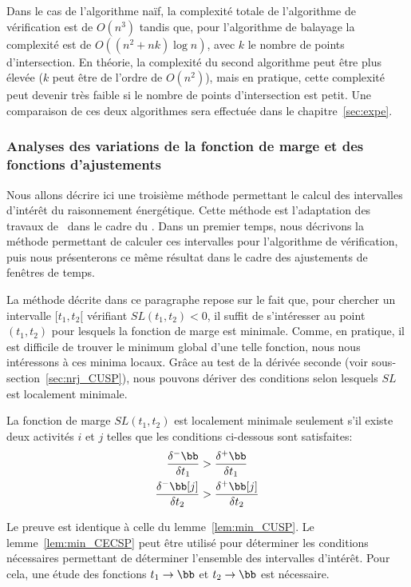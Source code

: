 Dans le cas de l'algorithme naïf, la complexité totale de l'algorithme
de vérification est de $O(n^3)$ tandis que, pour l'algorithme de
balayage la complexité est de $O((n^2+nk) \log n)$, avec $k$ le nombre
de points d'intersection. En théorie, la complexité du second
algorithme peut être plus élevée ($k$ peut être de l'ordre de
$O(n^2)$), mais en pratique, cette complexité peut devenir très faible
si le nombre de points d'intersection est petit. Une comparaison de
ces deux algorithmes sera effectuée dans le chapitre~\ref{sec:expe}.

\subsubsection{Analyses des variations de la fonction de marge et des
  fonctions d'ajustements}

Nous allons décrire ici une troisième méthode permettant le calcul des
intervalles d'intérêt du raisonnement énergétique. Cette méthode est
l'adaptation des travaux de~\cite{DP} dans le cadre du \CUSP. Dans un
premier temps, nous décrivons la méthode permettant de calculer ces
intervalles pour l'algorithme de vérification, puis nous présenterons
ce même résultat dans le cadre des ajustements de fenêtres de temps. 

 La méthode décrite dans ce paragraphe repose sur le fait que, pour
 chercher un intervalle $[t_1,t_2[$ vérifiant $SL(t_1,t_2) < 0$, il
 suffit de s'intéresser au point $(t_1,t_2)$ pour lesquels la
 fonction de marge est minimale. Comme, en pratique, il est difficile
 de trouver le minimum global d'une telle fonction, nous nous
 intéressons à ces minima locaux. Grâce au test de la dérivée
 seconde (voir sous-section~\ref{sec:nrj_CUSP}), nous pouvons dériver
 des conditions selon lesquels $SL$ est localement minimale.

\begin{lemma}[\cite{DP}]
\label{lem:min_CECSP}
La fonction de marge $SL(t_1,t_2)$ est localement minimale seulement
s'il existe deux activités $i$ et $j$ telles que les conditions
ci-dessous sont satisfaites: 
\begin{align} \frac{\delta^{-}\bb}{\delta t_1} &>
\frac{\delta^{+}\bb}{\delta t_1} \label{eq:deriv1_CECSP}\\ 
\frac{\delta^{-}\bb[j]}{\delta t_2}
& > \frac{\delta^{+}\bb[j]}{\delta t_2} \label{eq:deriv2_CECSP}
\end{align}
\end{lemma}

Le preuve est identique à celle du lemme~\ref{lem:min_CUSP}. Le
lemme~\ref{lem:min_CECSP} peut être utilisé pour déterminer les
conditions nécessaires permettant de déterminer l'ensemble des
intervalles d'intérêt. Pour cela, une étude des fonctions $t_1
\rightarrow \bb$ et $t_2 \rightarrow \bb$ est nécessaire. 

